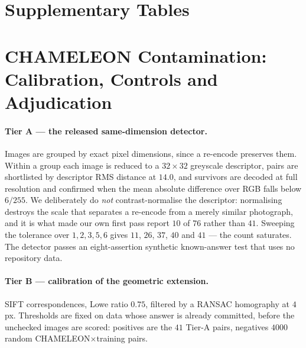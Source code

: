 \documentclass{article} %
\begin{document}
\section{Supplementary Tables}
\label{app:tables}



\section{CHAMELEON Contamination: Calibration, Controls and Adjudication}
\label{app:chamext}

\paragraph{Tier A --- the released same-dimension detector.} Images are grouped by exact pixel
dimensions, since a re-encode preserves them. Within a group each image is reduced to a
$32\times32$ greyscale descriptor, pairs are shortlisted by descriptor RMS distance at $14.0$, and
survivors are decoded at full resolution and confirmed when the mean absolute difference over RGB
falls below $6/255$. We deliberately do \emph{not} contrast-normalise the descriptor: normalising
destroys the scale that separates a re-encode from a merely similar photograph, and it is what made
our own first pass report $10$ of $76$ rather than $41$. Sweeping the tolerance over
$1, 2, 3, 5, 6$ gives $11$, $26$, $37$, $40$ and $41$ --- the count saturates. The detector passes an
eight-assertion synthetic known-answer test that uses no repository data.

\paragraph{Tier B --- calibration of the geometric extension.} SIFT correspondences, Lowe ratio
$0.75$, filtered by a RANSAC homography at $4$ px. Thresholds are fixed on data whose answer is
already committed, before the unchecked images are scored: positives are the $41$ Tier-A pairs,
negatives $4000$ random CHAMELEON$\times$training pairs.
\end{document}
